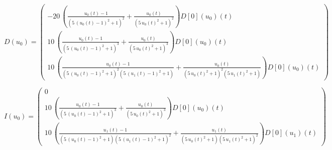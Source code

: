 \documentclass{article}
\begin{document}
\[
  D(u_0) = \left(\begin{array}{c}
  -20 \, {\left(\frac{u_{0}\left(t\right) - 1}{{\left(5 \, {\left(u_{0}\left(t\right) - 1\right)}^{2} + 1\right)}^{2}} + \frac{u_{0}\left(t\right)}{{\left(5 \, u_{0}\left(t\right)^{2} + 1\right)}^{2}}\right)} D[0]\left(u_{0}\right)\left(t\right)\\
  10 \, {\left(\frac{u_{0}\left(t\right) - 1}{{\left(5 \, {\left(u_{0}\left(t\right) - 1\right)}^{2} + 1\right)}^{3}} + \frac{u_{0}\left(t\right)}{{\left(5 \, u_{0}\left(t\right)^{2} + 1\right)}^{3}}\right)} D[0]\left(u_{0}\right)\left(t\right)\\
  10 \, {\left(\frac{u_{0}\left(t\right) - 1}{{\left(5 \, {\left(u_{0}\left(t\right) - 1\right)}^{2} + 1\right)}^{2} {\left(5 \, {\left(u_{1}\left(t\right) - 1\right)}^{2} + 1\right)}} + \frac{u_{0}\left(t\right)}{{\left(5 \, u_{0}\left(t\right)^{2} + 1\right)}^{2} {\left(5 \, u_{1}\left(t\right)^{2} + 1\right)}}\right)} D[0]\left(u_{0}\right)\left(t\right)
\end{array}\right)
\]

\[
  I(u_0) = \left(\begin{array}{c}
  0\\
  10 \, {\left(\frac{u_{0}\left(t\right) - 1}{{\left(5 \, {\left(u_{0}\left(t\right) - 1\right)}^{2} + 1\right)}^{3}} + \frac{u_{0}\left(t\right)}{{\left(5 \, u_{0}\left(t\right)^{2} + 1\right)}^{3}}\right)} D[0]\left(u_{0}\right)\left(t\right)\\
  10 \, {\left(\frac{u_{1}\left(t\right) - 1}{{\left(5 \, {\left(u_{0}\left(t\right) - 1\right)}^{2} + 1\right)} {\left(5 \, {\left(u_{1}\left(t\right) - 1\right)}^{2} + 1\right)}^{2}} + \frac{u_{1}\left(t\right)}{{\left(5 \, u_{0}\left(t\right)^{2} + 1\right)} {\left(5 \, u_{1}\left(t\right)^{2} + 1\right)}^{2}}\right)} D[0]\left(u_{1}\right)\left(t\right)
\end{array}\right)
\]
\end{document}
